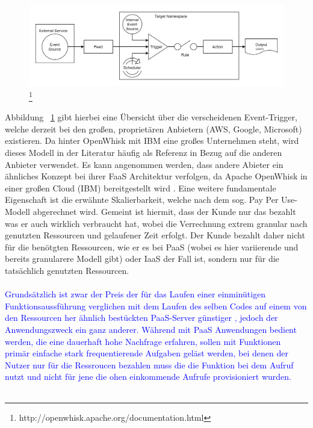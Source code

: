\documentclass[11pt]{article}
\begin{document}
\begin{figure}[H]
\caption[FaaS Programming Model nach OpenWhisk]{\footnote{http://openwhisk.apache.org/documentation.html}}
\label{fig:openWhiskProgrammingModel}
\centering
\includegraphics[width=1\textwidth]{ProgrammingModel}
\end{figure}
Abbildung ~\ref{fig:openWhiskProgrammingModel} gibt hierbei eine Übersicht über die verscheidenen Event-Trigger, welche derzeit bei den großen, proprietären Anbietern (AWS, Google, Microsoft) existieren. Da hinter OpenWhisk mit IBM eine großes Unternehmen steht, wird dieses Modell in der Literatur häufig als Referenz in Bezug auf die anderen Anbieter verwendet. Es kann angenommen werden, dass andere Abieter ein ähnliches Konzept bei ihrer FaaS Architektur verfolgen, da Apache OpenWhisk in einer großen Cloud (IBM) bereitgestellt wird \cite{van2019spec}. Eine weitere fundamentale Eigenschaft ist die erwähnte Skalierbarkeit, welche nach dem sog. \glqq Pay Per Use\grqq{}-Modell abgerechnet wird. Gemeint ist hiermit, dass der Kunde nur das bezahlt was er auch wirklich verbraucht hat, wobei die Verrechnung extrem granular nach genutzten Ressourcen und gelaufener Zeit erfolgt. Der Kunde bezahlt daher nicht für die benötgten Ressourcen, wie er es bei PaaS (wobei es hier variierende und bereits granularere Modell gibt) oder IaaS der Fall ist, sondern nur für die tatsächlich genutzten Ressourcen.\\\\
\textcolor{blue}{Grundsätzlich ist zwar der Preis der für das Laufen einer einminütigen Funktionsaussführung verglichen mit dem Laufen des selben Codes auf einem von den Ressourcen her ähnlich bestückten PaaS-Server günstiger \cite{jonas2019cloud}, jedoch der Anwendungszweck ein ganz anderer. Während mit PaaS Anwendungen bedient werden, die eine dauerhaft hohe Nachfrage erfahren, sollen mit Funktionen primär einfache stark frequentierende Aufgaben geläst werden, bei denen der Nutzer nur für die Ressroucen bezahlen muss die die Funktion bei dem Aufruf nutzt und nicht für jene die ohen einkommende Aufrufe provisioniert wurden.}\\\\
\end{document}
